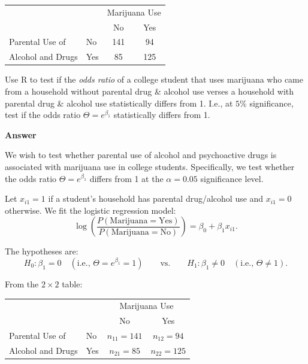 \documentclass[letterpaper]{article}
\begin{document}
	\begin{table}[h]
		\centering
		\begin{tabular}{llcc}
			\hline
			& & \multicolumn{2}{c}{Marijuana Use} \\
			& & No & Yes \\
			\hline
			Parental Use of & No & 141 & 94 \\
			Alcohol and Drugs & Yes & 85 & 125 \\
			\hline
		\end{tabular}
	\end{table}
	
	Use R to test if the \textit{odds ratio} of a college student that uses marijuana who came from a household without parental drug \& alcohol use verses a household with parental drug \& alcohol use statistically differs from 1. I.e., at $5\%$ significance, test if the odds ratio $\Theta = e^{\beta_1}$ statistically differs from 1.

	
	\textbf{Answer}
	
	

		We wish to test whether parental use of alcohol and psychoactive drugs is
		associated with marijuana use in college students. Specifically, we test
		whether the odds ratio $\Theta = e^{\beta_1}$ differs from 1 at the
		$\alpha = 0.05$ significance level.
		
		Let $x_{i1} = 1$ if a student's household has parental drug/alcohol use and
		$x_{i1} = 0$ otherwise. We fit the logistic regression model:
		\[
		\log\!\left(\frac{P(\text{Marijuana} = \text{Yes})}{P(\text{Marijuana} = \text{No})}\right)
		= \beta_0 + \beta_1 x_{i1}.
		\]
		
		The hypotheses are:
		\[
		H_0: \beta_1 = 0 \quad (\text{i.e., } \Theta = e^{\beta_1} = 1)
		\qquad \text{vs.} \qquad
		H_1: \beta_1 \neq 0 \quad (\text{i.e., } \Theta \neq 1).
		\]
		
	
		
		From the $2 \times 2$ table:
		
		\begin{table}[H]
			\centering
			\begin{tabular}{llcc}
				\hline
				& & \multicolumn{2}{c}{Marijuana Use} \\
				& & No & Yes \\
				\hline
				Parental Use of & No  & $n_{11} = 141$ & $n_{12} = 94$  \\
				Alcohol and Drugs & Yes & $n_{21} = 85$  & $n_{22} = 125$ \\
				\hline
			\end{tabular}
		\end{table}
		
\end{document}
